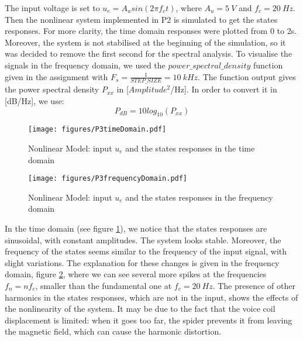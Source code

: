 The input voltage is set to $u_e = A_u sin(2\pi f_c t)$, where $A_u = 5 \ V$ and $f_c = 20 \ Hz$.
Then the nonlinear system implemented in P2 is simulated to get the states responses. For more clarity, the time domain responses were plotted from 0 to 2s. Moreover, the system is not stabilised at the beginning of the simulation, so it was decided to remove the first second for the spectral analysis. To visualise the signals in the frequency domain, we used the \textit{$power\_spectral\_density$} function given in the assignment \cite{assign} with $F_s = \frac{1}{STEP\_SIZE} = 10 \ kHz$. The function output gives the power spectral density $P_{xx}$ in [$Amplitude^2$/Hz]. In order to convert it in [dB/Hz], we use: 
\begin{equation*}
P_{dB} = 10log_{10}(P_{xx})
\end{equation*} 

\begin{figure}[H]
 \centering 
 \texttt{[image: figures/P3timeDomain.pdf]}
 \caption{Nonlinear Model: input $u_e$ and the states responses in the time domain}
 \label{fig:NLMt}
\end{figure}

\begin{figure}[H]
 \centering 
 \texttt{[image: figures/P3frequencyDomain.pdf]}
 \caption{Nonlinear Model: input $u_e$ and the states responses in the frequency domain}
 \label{fig:NLMf}
\end{figure}

In the time domain (see figure \ref{fig:NLMt}), we notice that the states responses are sinusoidal, with constant amplitudes. The system looks stable. Moreover, the frequency of the states seems similar to the frequency of the input signal, with slight variations. The explanation for these changes is given in the frequency domain, figure \ref{fig:NLMf}, where we can see several more spikes at the frequencies $f_n = nf_c$, smaller than the fundamental one at $f_c = 20 \ Hz$. The presence of other harmonics in the states responses, which are not in the input, shows the effects of the nonlinearity of the system. It may be due to the fact that the voice coil displacement is limited: when it goes too far, the spider prevents it from leaving the magnetic field, which can cause the harmonic distortion. 